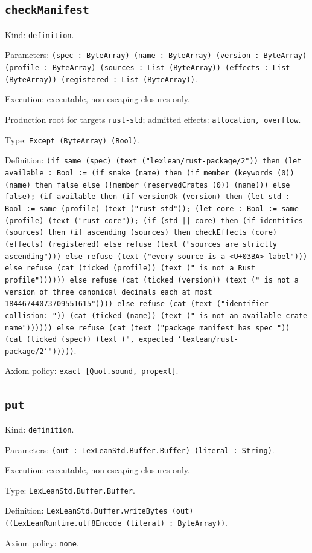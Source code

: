\documentclass[11pt]{article}
\begin{document}
\subsection*{\texttt{checkManifest}}
\noindent Kind: \texttt{definition}.\par
\noindent Parameters: \texttt{(spec : ByteArray) (name : ByteArray) (version : ByteArray) (profile : ByteArray) (sources : List (ByteArray)) (effects : List (ByteArray)) (registered : List (ByteArray))}.\par
\noindent Execution: executable, non-escaping closures only.\par
\noindent Production root for targets \texttt{rust-std}; admitted effects: \texttt{allocation, overflow}.\par
\noindent Type: \texttt{Except (ByteArray) (Bool)}.\par
\noindent Definition: \texttt{(if same (spec) (text ("lexlean/rust-package/2")) then (let available : Bool := (if snake (name) then (if member (keywords (0)) (name) then false else (!member (reservedCrates (0)) (name))) else false); (if available then (if versionOk (version) then (let std : Bool := same (profile) (text ("rust-std")); (let core : Bool := same (profile) (text ("rust-core")); (if (std || core) then (if identities (sources) then (if ascending (sources) then checkEffects (core) (effects) (registered) else refuse (text ("sources are strictly ascending"))) else refuse (text ("every source is a <U+03BA>-label"))) else refuse (cat (ticked (profile)) (text (" is not a Rust profile")))))) else refuse (cat (ticked (version)) (text (" is not a version of three canonical decimals each at most 18446744073709551615")))) else refuse (cat (text ("identifier collision: ")) (cat (ticked (name)) (text (" is not an available crate name")))))) else refuse (cat (text ("package manifest has spec ")) (cat (ticked (spec)) (text (", expected `lexlean/rust-package/2`")))))}.\par
\noindent Axiom policy: \texttt{exact [Quot.sound, propext]}.\par
\subsection*{\texttt{put}}
\noindent Kind: \texttt{definition}.\par
\noindent Parameters: \texttt{(out : LexLeanStd.Buffer.Buffer) (literal : String)}.\par
\noindent Execution: executable, non-escaping closures only.\par
\noindent Type: \texttt{LexLeanStd.Buffer.Buffer}.\par
\noindent Definition: \texttt{LexLeanStd.Buffer.writeBytes (out) ((LexLeanRuntime.utf8Encode (literal) : ByteArray))}.\par
\noindent Axiom policy: \texttt{none}.\par
\end{document}
